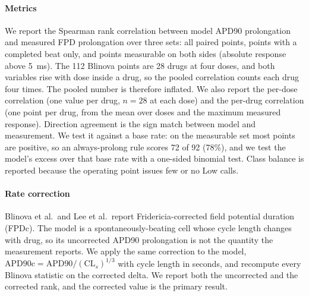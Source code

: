 \documentclass[preprint,12pt]{elsarticle}
\begin{document}
\paragraph{Metrics}
We report the Spearman rank correlation between model APD90 prolongation and measured
FPD prolongation over three sets: all paired points, points with a completed
beat only, and points measurable on both sides (absolute response above 5~ms).
The 112 Blinova points are 28 drugs at four doses, and both variables rise
with dose inside a drug, so the pooled correlation counts each drug four times.
The pooled number is therefore inflated. We also report the per-dose correlation
(one value per drug, $n = 28$ at each dose) and the
per-drug correlation (one point per drug, from the mean over doses and the maximum
measured response). Direction agreement is the sign match between model and measurement.
We test it against a base rate: on the measurable set most points are positive, so
an always-prolong rule scores 72 of 92 (78\%), and we test the model's excess over that
base rate with a one-sided binomial test. Class balance is reported because the
operating point issues few or no Low calls.

\paragraph{Rate correction}
Blinova et al.\ and Lee et al.\ report Fridericia-corrected field potential duration
(FPDc). The model is a spontaneously-beating cell whose cycle length changes with drug,
so its uncorrected APD90 prolongation is not the quantity the measurement reports. We
apply the same correction to the model, $\mathrm{APD90c} = \mathrm{APD90}/(\mathrm{CL}_s)^{1/3}$
with cycle length in seconds, and recompute every Blinova statistic on the corrected
delta. We report both the uncorrected and the corrected rank, and the corrected value is
the primary result.
\end{document}
